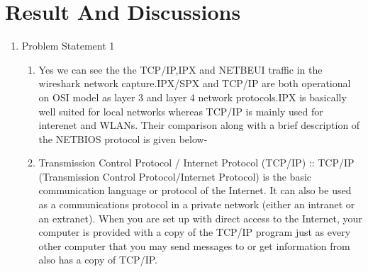 \documentclass[a4paper,12pt,oneside]{article}
\begin{document}
\section{Result And Discussions}
\begin{enumerate}
\item Problem Statement 1
\begin{enumerate}
\item Yes we can see the the TCP/IP,IPX and NETBEUI traffic in the wireshark network capture.IPX/SPX and TCP/IP are both operational on
OSI model as layer 3 and layer 4 network protocols.IPX is basically well suited for local networks whereas TCP/IP is mainly used for interenet and WLANs.
Their comparison along with a brief description of the NETBIOS protocol is given below-



 \item  Transmission Control Protocol / Internet Protocol (TCP/IP) :: TCP/IP (Transmission Control Protocol/Internet Protocol) is the basic communication language or protocol of the Internet. It can also be used as a communications protocol in a private network (either an intranet or an extranet). When you are set up with direct access to the Internet, your computer is provided with a copy of the TCP/IP program just as every other computer that you may send messages to or get information from also has a copy of TCP/IP.



\end{enumerate}
\end{enumerate}
\end{document}
